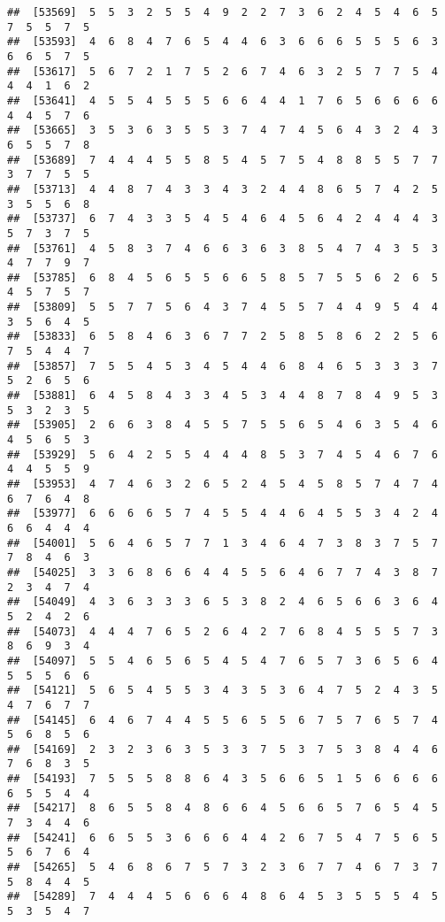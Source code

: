 \documentclass[
]{book}
\begin{document}
\begin{verbatim}
##  [53569]  5  5  3  2  5  5  4  9  2  2  7  3  6  2  4  5  4  6  5  7  5  5  7  5
##  [53593]  4  6  8  4  7  6  5  4  4  6  3  6  6  6  5  5  5  6  3  6  6  5  7  5
##  [53617]  5  6  7  2  1  7  5  2  6  7  4  6  3  2  5  7  7  5  4  4  4  1  6  2
##  [53641]  4  5  5  4  5  5  5  6  6  4  4  1  7  6  5  6  6  6  6  4  4  5  7  6
##  [53665]  3  5  3  6  3  5  5  3  7  4  7  4  5  6  4  3  2  4  3  6  5  5  7  8
##  [53689]  7  4  4  4  5  5  8  5  4  5  7  5  4  8  8  5  5  7  7  3  7  7  5  5
##  [53713]  4  4  8  7  4  3  3  4  3  2  4  4  8  6  5  7  4  2  5  3  5  5  6  8
##  [53737]  6  7  4  3  3  5  4  5  4  6  4  5  6  4  2  4  4  4  3  5  7  3  7  5
##  [53761]  4  5  8  3  7  4  6  6  3  6  3  8  5  4  7  4  3  5  3  4  7  7  9  7
##  [53785]  6  8  4  5  6  5  5  6  6  5  8  5  7  5  5  6  2  6  5  4  5  7  5  7
##  [53809]  5  5  7  7  5  6  4  3  7  4  5  5  7  4  4  9  5  4  4  3  5  6  4  5
##  [53833]  6  5  8  4  6  3  6  7  7  2  5  8  5  8  6  2  2  5  6  7  5  4  4  7
##  [53857]  7  5  5  4  5  3  4  5  4  4  6  8  4  6  5  3  3  3  7  5  2  6  5  6
##  [53881]  6  4  5  8  4  3  3  4  5  3  4  4  8  7  8  4  9  5  3  5  3  2  3  5
##  [53905]  2  6  6  3  8  4  5  5  7  5  5  6  5  4  6  3  5  4  6  4  5  6  5  3
##  [53929]  5  6  4  2  5  5  4  4  4  8  5  3  7  4  5  4  6  7  6  4  4  5  5  9
##  [53953]  4  7  4  6  3  2  6  5  2  4  5  4  5  8  5  7  4  7  4  6  7  6  4  8
##  [53977]  6  6  6  6  5  7  4  5  5  4  4  6  4  5  5  3  4  2  4  6  6  4  4  4
##  [54001]  5  6  4  6  5  7  7  1  3  4  6  4  7  3  8  3  7  5  7  7  8  4  6  3
##  [54025]  3  3  6  8  6  6  4  4  5  5  6  4  6  7  7  4  3  8  7  2  3  4  7  4
##  [54049]  4  3  6  3  3  3  6  5  3  8  2  4  6  5  6  6  3  6  4  5  2  4  2  6
##  [54073]  4  4  4  7  6  5  2  6  4  2  7  6  8  4  5  5  5  7  3  8  6  9  3  4
##  [54097]  5  5  4  6  5  6  5  4  5  4  7  6  5  7  3  6  5  6  4  5  5  5  6  6
##  [54121]  5  6  5  4  5  5  3  4  3  5  3  6  4  7  5  2  4  3  5  4  7  6  7  7
##  [54145]  6  4  6  7  4  4  5  5  6  5  5  6  7  5  7  6  5  7  4  5  6  8  5  6
##  [54169]  2  3  2  3  6  3  5  3  3  7  5  3  7  5  3  8  4  4  6  7  6  8  3  5
##  [54193]  7  5  5  5  8  8  6  4  3  5  6  6  5  1  5  6  6  6  6  6  5  5  4  4
##  [54217]  8  6  5  5  8  4  8  6  6  4  5  6  6  5  7  6  5  4  5  7  3  4  4  6
##  [54241]  6  6  5  5  3  6  6  6  4  4  2  6  7  5  4  7  5  6  5  5  6  7  6  4
##  [54265]  5  4  6  8  6  7  5  7  3  2  3  6  7  7  4  6  7  3  7  5  8  4  4  5
##  [54289]  7  4  4  4  5  6  6  6  4  8  6  4  5  3  5  5  5  4  5  5  3  5  4  7

\end{verbatim}
\end{document}
